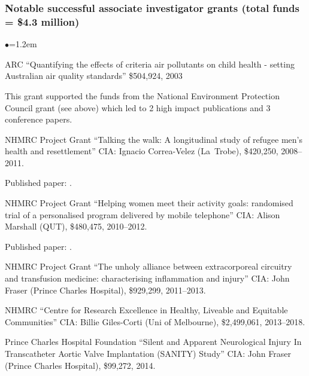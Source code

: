 \documentclass[a4paper,11pt]{article}
\renewcommand{\labelitemi}{$\bullet$}
\begin{document}
\begin{raggedright}
\subsubsection*{Notable successful associate investigator grants (total funds = \$4.3 million)} %

\begin{list}{\labelitemi}{\leftmargin=1.2em}\addtolength{\itemsep}{-0.5\baselineskip}

\item ARC ``Quantifying the effects of criteria air pollutants on child health - setting Australian air quality standards'' \$504,924, 2003

    This grant supported the funds from the National Environment Protection Council grant (see above) which led to 2 high impact publications  and 3 conference papers. %

\item NHMRC Project Grant ``Talking the walk: A longitudinal study of refugee men's health and resettlement'' CIA: Ignacio Correa-Velez (La~Trobe), \$420,250, 2008--2011. 

    Published paper: .


\item NHMRC Project Grant ``Helping women meet their activity goals: randomised trial of a personalised program delivered by mobile telephone'' CIA: Alison Marshall (QUT), \$480,475, 2010--2012.

    Published paper: .

\item NHMRC Project Grant ``The unholy alliance between extracorporeal circuitry and transfusion medicine: characterising inflammation and injury'' CIA: John Fraser (Prince Charles Hospital), \$929,299, 2011--2013.

\item NHMRC ``Centre for Research Excellence in Healthy, Liveable and Equitable Communities'' CIA: Billie Giles-Corti (Uni of Melbourne), \$2,499,061, 2013--2018.

\item Prince Charles Hospital Foundation ``Silent and Apparent Neurological Injury In Transcatheter Aortic Valve Implantation (SANITY) Study'' CIA: John Fraser (Prince Charles Hospital), \$99,272, 2014.


\end{list}
\end{raggedright}
\end{document}
